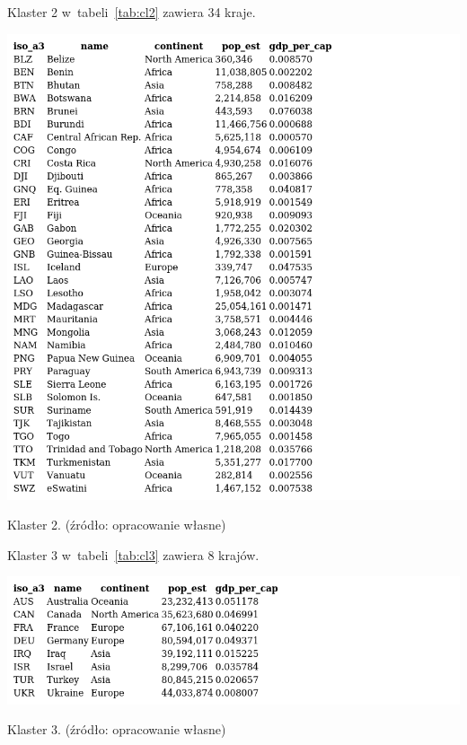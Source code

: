 \documentclass[11pt]{report}
\begin{document}
    Klaster 2 w~tabeli~\ref{tab:cl2} zawiera 34 kraje.
    \begin{table}[!htp]
        \centering
        \includegraphics[width=\linewidth]{tables/CLUST/clust2kmeans.png}
        \caption{Klaster 2. (źródło: opracowanie własne)}
        \label{tab:cl2}
    \end{table}

    Klaster 3 w~tabeli~\ref{tab:cl3} zawiera 8 krajów.
    \begin{table}[!htp]
        \centering
        \includegraphics[width=\linewidth]{tables/CLUST/clust3kmeans.png}
        \caption{Klaster 3. (źródło: opracowanie własne)}
        \label{tab:cl3}
    \end{table}
\end{document}

